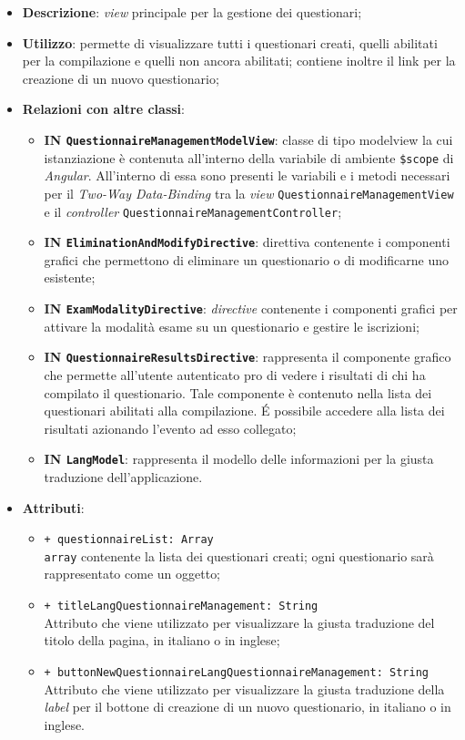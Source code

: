 \begin{itemize}
	\item \textbf{Descrizione}: \textit{view} principale per la gestione dei questionari;
	\item \textbf{Utilizzo}: permette di visualizzare tutti i questionari creati, quelli abilitati per la compilazione e quelli non ancora abilitati; contiene inoltre il link per la creazione di un nuovo questionario;
	\item \textbf{Relazioni con altre classi}:
	\begin{itemize}
		\item \textbf{IN \texttt{QuestionnaireManagementModelView}}: classe di tipo modelview la cui istanziazione è contenuta all'interno della variabile di ambiente \texttt{\$scope} di \textit{Angular}. All'interno di essa sono presenti le variabili e i metodi necessari per il \textit{Two-Way Data-Binding} tra la \textit{view} \texttt{QuestionnaireManagementView} e il \textit{controller} \texttt{QuestionnaireManagementController};
		\item \textbf{IN \texttt{EliminationAndModifyDirective}}: direttiva contenente i componenti grafici  che permettono di eliminare un questionario o di modificarne uno esistente;
		\item \textbf{IN \texttt{ExamModalityDirective}}: \textit{directive} contenente i componenti grafici per attivare la modalità esame su un questionario e gestire le iscrizioni;
		\item \textbf{IN \texttt{QuestionnaireResultsDirective}}: rappresenta il componente grafico che permette all'utente autenticato pro di vedere i risultati di chi ha compilato il questionario. Tale componente è contenuto nella lista dei questionari abilitati alla compilazione. \'E possibile accedere alla lista dei risultati azionando l'evento ad esso collegato;
		\item \textbf{IN \texttt{LangModel}}: rappresenta il modello delle informazioni per la giusta traduzione dell'applicazione.
	\end{itemize}
		\item \textbf{Attributi}:
		\begin{itemize}
			\item \texttt{+ questionnaireList: Array} \\ \texttt{array} contenente la lista dei questionari creati; ogni questionario sarà rappresentato come un oggetto;
			\item \texttt{+ titleLangQuestionnaireManagement: String} \\ Attributo che viene utilizzato per visualizzare la giusta traduzione del titolo della pagina, in italiano o in inglese;
			\item \texttt{+ buttonNewQuestionnaireLangQuestionnaireManagement: String} \\ Attributo che viene utilizzato per visualizzare la giusta traduzione della \textit{label} per il bottone di creazione di un nuovo questionario, in italiano o in inglese.
		\end{itemize}
\end{itemize}
